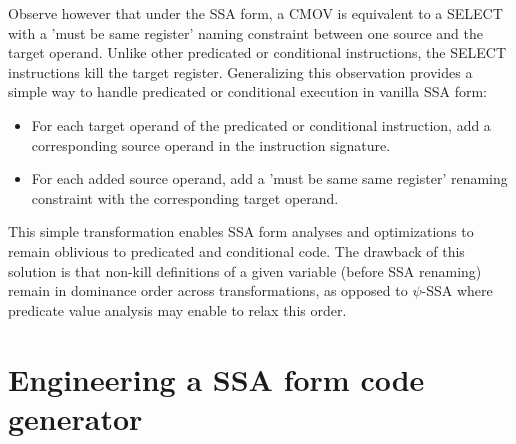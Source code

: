 Observe however that under the SSA form, a CMOV is equivalent to a SELECT with a
'must be same register' naming constraint between one source and the target
operand. Unlike other predicated or conditional instructions, the SELECT
instructions kill the target register.  Generalizing this observation provides a
simple way to handle predicated or conditional execution in vanilla SSA form:
\begin{itemize}

\item For each target operand of the predicated or conditional instruction, add
a corresponding source operand in the instruction signature.

\item For each added source operand, add a 'must be same same register' renaming
constraint with the corresponding target operand.

\end{itemize}
This simple transformation enables SSA form analyses and optimizations to remain
oblivious to predicated and conditional code. The drawback of this solution is
that non-kill definitions of a given variable (before SSA renaming) remain in
dominance order across transformations, as opposed to $\psi$-SSA where predicate
value analysis may enable to relax this order.


\section{Engineering a SSA form code generator}
\label{sec:ssa-codegen-engineering}

%
%
%
%
%
%

%
%

